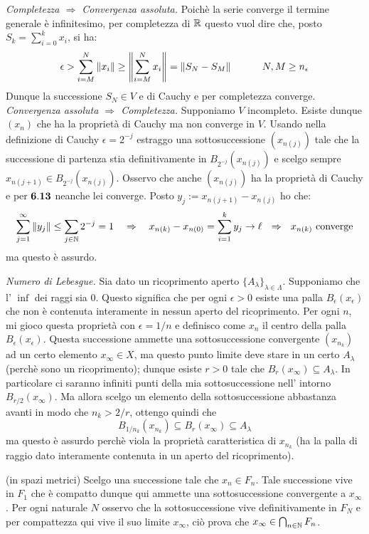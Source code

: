  {\it Completezza $\Rightarrow$ Convergenza assoluta.} Poichè la serie converge il termine generale è infinitesimo, per completezza di $\mathbb{R}$ questo vuol dire che, posto $S_k=\sum_{i=0}^k x_i$, si ha:
$$ \epsilon>\sum_{i=M}^{N}\left \| x_i \right\|\geq \left \| \sum_{i=M}^{N}x_i \right\|=\left \| S_N-S_M \right\|\qquad\quad N,M \geq n_{\epsilon} $$
Dunque la successione $S_N\in V$ e di Cauchy e per completezza converge.\\ 
{\it Convergenza assoluta $\Rightarrow$ Completezza.} Supponiamo $V$ incompleto. Esiste dunque $(x_n)$ che ha la proprietà di Cauchy ma non converge in $V$. Usando nella definizione di Cauchy $\epsilon=2^{-j}$ estraggo una sottosuccessione $(x_{n(j)})$ tale che la successione di partenza stia definitivamente in $B_{2^{-j}}(x_{n(j)})$ e scelgo sempre $x_{n(j+1)}\in B_{2^{-j}}(x_{n(j)})$. Osservo che anche $(x_{n(j)})$ ha la proprietà di Cauchy e per ${\bf 6.13}$ neanche lei converge. Posto $y_j:=x_{n(j+1)}-x_{n(j)}$ ho che:
$$ \sum_{j=1}^{\infty}\Norm{y_j}\leq \sum_{j\in\NN}2^{-j}=1\quad \Rightarrow\quad x_{n(k)}-x_{n(0)}=\sum_{i=1}^{k}y_j\rightarrow \ell\ \  \Rightarrow\ \  x_{n(k)}\mbox{ converge} $$ 
ma questo è assurdo.

 {\it Numero di Lebesgue.} Sia dato un ricoprimento aperto $\{A_{\lambda}\}_{\lambda\in\Lambda}$. Supponiamo che l' $\inf$ dei raggi sia $0$. Questo significa che per ogni $\epsilon>0$ esiste una palla $B_{\epsilon}(x_{\epsilon})$ che non è contenuta interamente in nessun aperto del ricoprimento. Per ogni $n$, mi gioco questa proprietà con $\epsilon=1/n$ e definisco come $x_n$ il centro della palla $B_{\epsilon}(x_\epsilon)$. Questa successione ammette una sottosuccessione convergente $(x_{n_k})$ ad un certo elemento $x_{\infty}\in X$, ma questo punto limite deve stare in un certo $A_{\lambda}$ (perchè sono un ricoprimento); dunque esiste $r>0$ tale che $B_r(x_{\infty})\subseteq A_{\lambda}$. In particolare ci saranno infiniti punti della mia sottosuccessione nell' intorno $B_{r/2}(x_{\infty})$. Ma allora scelgo un elemento della sottosuccessione abbastanza avanti in modo che $n_k>2/r$, ottengo quindi che $$B_{1/{n_k}}(x_{n_k})\subseteq B_r(x_{\infty})\subseteq A_{\lambda}$$
ma questo è assurdo perchè viola la proprietà caratteristica di $x_{n_k}$ (ha la palla di raggio dato interamente contenuta in un aperto del ricoprimento).

 (\NINI in spazi metrici) Scelgo una successione tale che $x_n \in F_n$. Tale successione vive in $F_1$ che è compatto dunque qui ammette una sottosuccessione convergente a $x_{\infty}$. Per ogni naturale $N$ osservo che la sottosuccessione vive definitivamente in $F_N$ e per compattezza qui vive il suo limite $x_{\infty}$, ciò prova che $x_{\infty}\in \bigcap_{n\in \mathbb{N}}F_n$.

